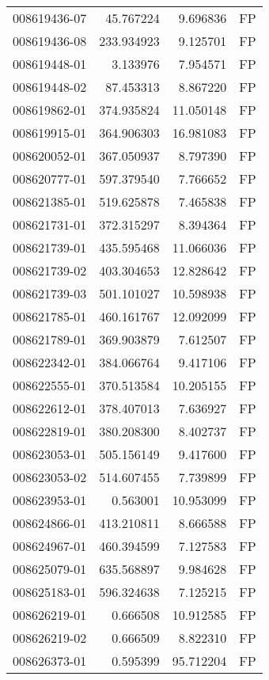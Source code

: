 \begin{tabular}{lrrl}
008619436-07 &   45.767224 &     9.696836 &   FP \\
008619436-08 &  233.934923 &     9.125701 &   FP \\
008619448-01 &    3.133976 &     7.954571 &   FP \\
008619448-02 &   87.453313 &     8.867220 &   FP \\
008619862-01 &  374.935824 &    11.050148 &   FP \\
008619915-01 &  364.906303 &    16.981083 &   FP \\
008620052-01 &  367.050937 &     8.797390 &   FP \\
008620777-01 &  597.379540 &     7.766652 &   FP \\
008621385-01 &  519.625878 &     7.465838 &   FP \\
008621731-01 &  372.315297 &     8.394364 &   FP \\
008621739-01 &  435.595468 &    11.066036 &   FP \\
008621739-02 &  403.304653 &    12.828642 &   FP \\
008621739-03 &  501.101027 &    10.598938 &   FP \\
008621785-01 &  460.161767 &    12.092099 &   FP \\
008621789-01 &  369.903879 &     7.612507 &   FP \\
008622342-01 &  384.066764 &     9.417106 &   FP \\
008622555-01 &  370.513584 &    10.205155 &   FP \\
008622612-01 &  378.407013 &     7.636927 &   FP \\
008622819-01 &  380.208300 &     8.402737 &   FP \\
008623053-01 &  505.156149 &     9.417600 &   FP \\
008623053-02 &  514.607455 &     7.739899 &   FP \\
008623953-01 &    0.563001 &    10.953099 &   FP \\
008624866-01 &  413.210811 &     8.666588 &   FP \\
008624967-01 &  460.394599 &     7.127583 &   FP \\
008625079-01 &  635.568897 &     9.984628 &   FP \\
008625183-01 &  596.324638 &     7.125215 &   FP \\
008626219-01 &    0.666508 &    10.912585 &   FP \\
008626219-02 &    0.666509 &     8.822310 &   FP \\
008626373-01 &    0.595399 &    95.712204 &   FP \\

\end{tabular}
